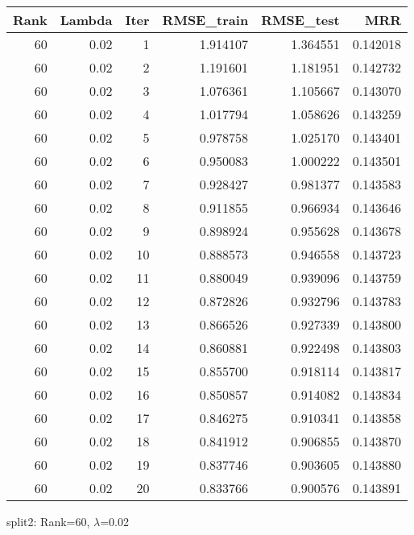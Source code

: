 \begin{tabular}{rrrrrr}
\toprule
 Rank &  Lambda &  Iter &  RMSE\_train &  RMSE\_test &       MRR \\
\midrule
   60 &    0.02 &     1 &    1.914107 &   1.364551 &  0.142018 \\
   60 &    0.02 &     2 &    1.191601 &   1.181951 &  0.142732 \\
   60 &    0.02 &     3 &    1.076361 &   1.105667 &  0.143070 \\
   60 &    0.02 &     4 &    1.017794 &   1.058626 &  0.143259 \\
   60 &    0.02 &     5 &    0.978758 &   1.025170 &  0.143401 \\
   60 &    0.02 &     6 &    0.950083 &   1.000222 &  0.143501 \\
   60 &    0.02 &     7 &    0.928427 &   0.981377 &  0.143583 \\
   60 &    0.02 &     8 &    0.911855 &   0.966934 &  0.143646 \\
   60 &    0.02 &     9 &    0.898924 &   0.955628 &  0.143678 \\
   60 &    0.02 &    10 &    0.888573 &   0.946558 &  0.143723 \\
   60 &    0.02 &    11 &    0.880049 &   0.939096 &  0.143759 \\
   60 &    0.02 &    12 &    0.872826 &   0.932796 &  0.143783 \\
   60 &    0.02 &    13 &    0.866526 &   0.927339 &  0.143800 \\
   60 &    0.02 &    14 &    0.860881 &   0.922498 &  0.143803 \\
   60 &    0.02 &    15 &    0.855700 &   0.918114 &  0.143817 \\
   60 &    0.02 &    16 &    0.850857 &   0.914082 &  0.143834 \\
   60 &    0.02 &    17 &    0.846275 &   0.910341 &  0.143858 \\
   60 &    0.02 &    18 &    0.841912 &   0.906855 &  0.143870 \\
   60 &    0.02 &    19 &    0.837746 &   0.903605 &  0.143880 \\
   60 &    0.02 &    20 &    0.833766 &   0.900576 &  0.143891 \\
\bottomrule
\end{tabular}

\caption{split2: Rank=60, $\lambda$=0.02}
